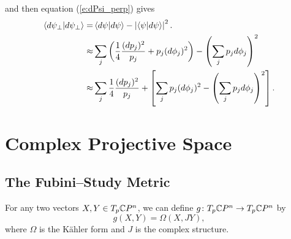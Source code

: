 and then equation (\ref{e:dPsi_perp}) gives
\begin{equation}
\begin{split}
    {\langle{d\psi_\perp}|{d\psi_\perp}\rangle} 
        =&\, {\langle{d\psi}|{d\psi}\rangle} - \left| {\langle{\psi}|{d\psi}\rangle} \right|^2.\\
        \approx& \sum_j 
                    \left( 
                           \frac{1}{4}\frac{(dp_j)^2}{p_j}
                           +p_j(d\phi_j)^2
                    \right)
            - \left( \sum_jp_jd\phi_j \right)^2\\
        \approx& \sum_j \frac{1}{4}\frac{(dp_j)^2}{p_j}
                  + \left[ 
                           \sum_j p_j(d\phi_j)^2
                           - \left( \sum_jp_jd\phi_j \right)^2
                    \right].
\end{split}
\end{equation}


\section{Complex Projective Space}



\subsection{The Fubini--Study Metric}

For any two vectors $X,Y\in T_p{\mathbb{C}} P^n$, we can define
$g\colon T_p{\mathbb{C}} P^n \to T_p{\mathbb{C}} P^n$ by
\begin{equation}
g(X,Y) = \Omega(X,JY),
\end{equation}
where $\Omega$ is the K\"ahler form and $J$ is the complex structure.

